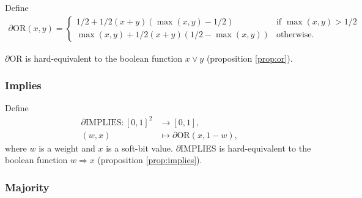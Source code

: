 \documentclass{article} %
\begin{document}
Define 
\begin{equation*}
\begin{aligned}
\partial\text{OR}(x, y) =
\begin{cases}
1/2 + 1/2(x + y)(\operatorname{max}(x,y) - 1/2) & \text{if } \operatorname{max}(x,y) > 1/2 \\
\operatorname{max}(x,y) + 1/2(x + y)(1/2 - \operatorname{max}(x,y)) & \text{otherwise.}
\end{cases}
\end{aligned}
\end{equation*}

$\partial${OR} is hard-equivalent to the boolean function $x \vee y$ (proposition \ref{prop:or}).

\subsubsection{Implies}

Define
\begin{equation*}
\begin{aligned}
\partial\text{IMPLIES}: [0,1]^{2} &\to [0,1],\\
(w, x) &\mapsto \partial\text{OR}(x, 1-w)\text{,}
\end{aligned}
\end{equation*}
where $w$ is a weight and $x$ is a soft-bit value.
$\partial${IMPLIES} is hard-equivalent to the boolean function $w \Rightarrow x$ (proposition \ref{prop:implies}).

\subsubsection{Majority}
\end{document}
